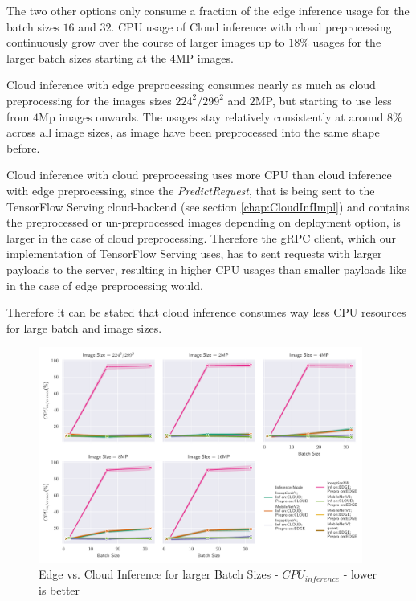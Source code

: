The two other options only consume a fraction of the edge inference usage for the batch sizes $16$ and $32$.
CPU usage of Cloud inference with cloud preprocessing continuously grow over the course of larger images up to $18\%$ usages for the larger batch sizes starting at the $4$MP images.

Cloud inference with edge preprocessing consumes nearly as much as cloud preprocessing for the images sizes $224^2/299^2$ and $2$MP, but starting to use less from $4$Mp images onwards.
The usages stay relatively consistently at around $8\%$ across all image sizes, as image have been preprocessed into the same shape before.

Cloud inference with cloud preprocessing uses more CPU than cloud inference with edge preprocessing, since the \emph{PredictRequest}, that is being sent to the TensorFlow Serving cloud-backend (see section \ref{chap:CloudInfImpl}) and contains the preprocessed or un-preprocessed images depending on deployment option, is larger in the case of cloud preprocessing.
Therefore the gRPC client, which our implementation of TensorFlow Serving uses, has to sent requests with larger payloads to the server, resulting in higher CPU usages than smaller payloads like in the case of edge preprocessing would.


Therefore it can be stated that cloud inference consumes way less CPU resources for large batch and image sizes.

\begin{figure}[!htb]
\centering
\includegraphics[width=0.95\textwidth]{./Bilder/single_plots/batch_size_plots/Effects_of_Batch_size_Inference_CPU_Usage.pdf}
\caption{Edge vs. Cloud Inference for larger Batch Sizes -  $CPU_{inference}$ - lower is better}
\label{fig:BatchSizeInferenceCPU}
\end{figure}

